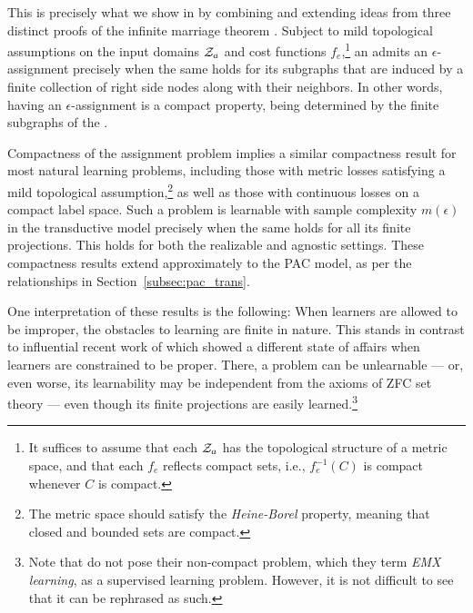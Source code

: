 This is precisely what we show in \citet{asilis_transductive_2024} by combining and extending ideas from three distinct proofs of the infinite marriage theorem \cite{jr_distinct_1948,rado_note_1967,halmos_marriage_1950}. Subject to mild topological assumptions on the input domains $\mathcal{Z}_a$ and cost functions $f_e$,\footnote{It suffices to assume that each $\mathcal{Z}_a$ has the topological structure of a metric space, and that each $f_e$ reflects compact sets, i.e.,  $f_e^{-1}(C)$ is compact whenever $C$ is compact.} an \fds admits an $\epsilon$-assignment precisely when the same holds for its subgraphs that are induced by a finite collection of right side nodes along with their neighbors. In other words, having an $\epsilon$-assignment is a compact property, being determined by the finite subgraphs of the \fds.  

Compactness of the \fds assignment problem implies a similar compactness result for most natural learning problems, including those with metric losses satisfying a mild topological assumption,\footnote{The metric space should satisfy the \emph{Heine-Borel} property, meaning that closed and bounded sets are compact.} as well as those with continuous losses on a compact label space. Such a problem is learnable with sample complexity $m(\epsilon)$ in the transductive model precisely when the same holds for all its finite projections. This holds for both the realizable and agnostic settings. %
%
These compactness results extend approximately to the PAC model, as per the relationships in Section~\ref{subsec:pac_trans}.


One interpretation of these results is the following: When learners are allowed to be improper, the obstacles to learning are finite in nature. This stands in contrast to influential recent work of \citet{ben-david_learnability_2019} which showed a different state of affairs when learners are constrained to be proper. There, a problem can be unlearnable --- or, even worse, its learnability may be independent from the axioms of ZFC set theory --- even though its finite projections are easily learned.\footnote{Note that \cite{ben-david_learnability_2019} do not pose their non-compact problem, which they term \emph{EMX learning}, as a supervised learning problem. However, it is not difficult to see that it can be rephrased as such.} 




